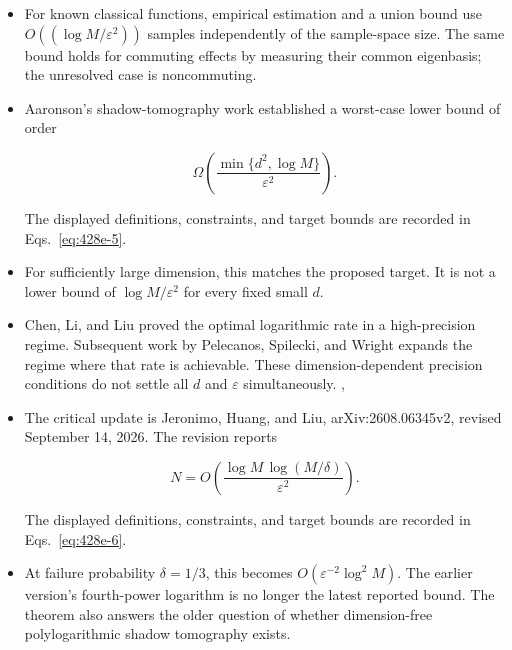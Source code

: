 \begin{itemize}
  \item For known classical functions, empirical estimation and a union bound use $O(\!\left(\log M/\varepsilon^2\right))$ samples independently of the sample-space size. The same bound holds for commuting effects by measuring their common eigenbasis; the unresolved case is noncommuting.

  \item Aaronson's shadow-tomography work established a worst-case lower bound of order

\begin{equation}
\Omega\!\left(\frac{\min\{d^2,\log M\}}{\varepsilon^2}\right).
\label{eq:428e-5}
\end{equation}

The displayed definitions, constraints, and target bounds are recorded in Eqs.~\eqref{eq:428e-5}.

  \item For sufficiently large dimension, this matches the proposed target. It is not a lower bound of $\log M/\varepsilon^2$ for every fixed small $d$. 

  \item Chen, Li, and Liu proved the optimal logarithmic rate in a high-precision regime. Subsequent work by Pelecanos, Spilecki, and Wright expands the regime where that rate is achievable. These dimension-dependent precision conditions do not settle all $d$ and $\varepsilon$ simultaneously. , 

  \item The critical update is Jeronimo, Huang, and Liu, arXiv:2608.06345v2, revised September 14, 2026. The revision reports

\begin{equation}
N=O\!\left(\frac{\log M\,\log(M/\delta)}{\varepsilon^2}\right).
\label{eq:428e-6}
\end{equation}

The displayed definitions, constraints, and target bounds are recorded in Eqs.~\eqref{eq:428e-6}.

  \item At failure probability $\delta=1/3$, this becomes $O(\varepsilon^{-2}\log^2 M)$. The earlier version's fourth-power logarithm is no longer the latest reported bound. The theorem also answers the older question of whether dimension-free polylogarithmic shadow tomography exists. 
\end{itemize}

